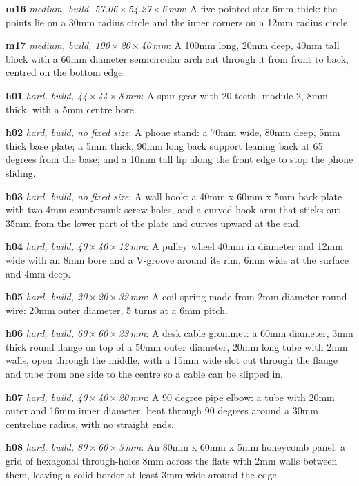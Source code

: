 {\noindent\textbf{m16} \emph{medium, build, 57.06\,$\times$\,54.27\,$\times$\,6\,mm}: A five-pointed star 6mm thick: the points lie on a 30mm radius circle and the inner corners on a 12mm radius circle.\par
\noindent\textbf{m17} \emph{medium, build, 100\,$\times$\,20\,$\times$\,40\,mm}: A 100mm long, 20mm deep, 40mm tall block with a 60mm diameter semicircular arch cut through it from front to back, centred on the bottom edge.\par
\noindent\textbf{h01} \emph{hard, build, 44\,$\times$\,44\,$\times$\,8\,mm}: A spur gear with 20 teeth, module 2, 8mm thick, with a 5mm centre bore.\par
\noindent\textbf{h02} \emph{hard, build, no fixed size}: A phone stand: a 70mm wide, 80mm deep, 5mm thick base plate; a 5mm thick, 90mm long back support leaning back at 65 degrees from the base; and a 10mm tall lip along the front edge to stop the phone sliding.\par
\noindent\textbf{h03} \emph{hard, build, no fixed size}: A wall hook: a 40mm x 60mm x 5mm back plate with two 4mm countersunk screw holes, and a curved hook arm that sticks out 35mm from the lower part of the plate and curves upward at the end.\par
\noindent\textbf{h04} \emph{hard, build, 40\,$\times$\,40\,$\times$\,12\,mm}: A pulley wheel 40mm in diameter and 12mm wide with an 8mm bore and a V-groove around its rim, 6mm wide at the surface and 4mm deep.\par
\noindent\textbf{h05} \emph{hard, build, 20\,$\times$\,20\,$\times$\,32\,mm}: A coil spring made from 2mm diameter round wire: 20mm outer diameter, 5 turns at a 6mm pitch.\par
\noindent\textbf{h06} \emph{hard, build, 60\,$\times$\,60\,$\times$\,23\,mm}: A desk cable grommet: a 60mm diameter, 3mm thick round flange on top of a 50mm outer diameter, 20mm long tube with 2mm walls, open through the middle, with a 15mm wide slot cut through the flange and tube from one side to the centre so a cable can be slipped in.\par
\noindent\textbf{h07} \emph{hard, build, 40\,$\times$\,40\,$\times$\,20\,mm}: A 90 degree pipe elbow: a tube with 20mm outer and 16mm inner diameter, bent through 90 degrees around a 30mm centreline radius, with no straight ends.\par
\noindent\textbf{h08} \emph{hard, build, 80\,$\times$\,60\,$\times$\,5\,mm}: An 80mm x 60mm x 5mm honeycomb panel: a grid of hexagonal through-holes 8mm across the flats with 2mm walls between them, leaving a solid border at least 3mm wide around the edge.\par
}
